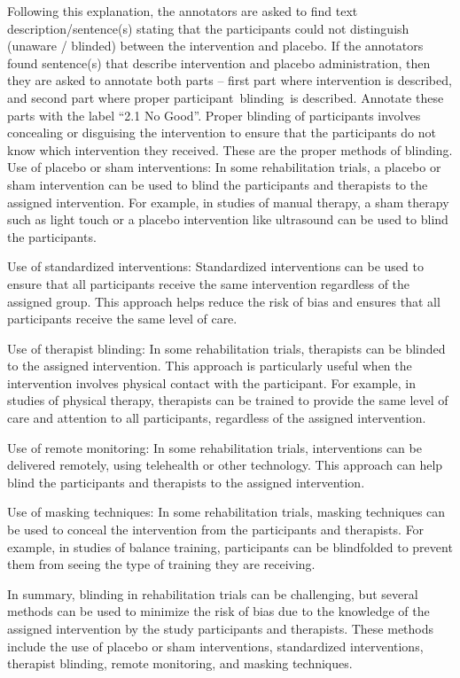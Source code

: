 \documentclass[sn-mathphys,Numbered]{sn-jnl}%
\begin{document}
Following this explanation, the annotators are asked to find text description/sentence(s) stating that the participants could not distinguish (unaware / blinded) between the intervention and placebo.
If the annotators found sentence(s) that describe intervention and placebo administration, then they are asked to annotate both parts – first part where intervention is described, and second part where proper participant blinding is described.
Annotate these parts with the label ``2.1 No Good''.
Proper blinding of participants involves concealing or disguising the intervention to ensure that the participants do not know which intervention they received.
These are the proper methods of blinding.
Use of placebo or sham interventions: In some rehabilitation trials, a placebo or sham intervention can be used to blind the participants and therapists to the assigned intervention. For example, in studies of manual therapy, a sham therapy such as light touch or a placebo intervention like ultrasound can be used to blind the participants.

Use of standardized interventions: Standardized interventions can be used to ensure that all participants receive the same intervention regardless of the assigned group. This approach helps reduce the risk of bias and ensures that all participants receive the same level of care.

Use of therapist blinding: In some rehabilitation trials, therapists can be blinded to the assigned intervention. This approach is particularly useful when the intervention involves physical contact with the participant. For example, in studies of physical therapy, therapists can be trained to provide the same level of care and attention to all participants, regardless of the assigned intervention.

Use of remote monitoring: In some rehabilitation trials, interventions can be delivered remotely, using telehealth or other technology. This approach can help blind the participants and therapists to the assigned intervention.

Use of masking techniques: In some rehabilitation trials, masking techniques can be used to conceal the intervention from the participants and therapists. For example, in studies of balance training, participants can be blindfolded to prevent them from seeing the type of training they are receiving.

In summary, blinding in rehabilitation trials can be challenging, but several methods can be used to minimize the risk of bias due to the knowledge of the assigned intervention by the study participants and therapists. These methods include the use of placebo or sham interventions, standardized interventions, therapist blinding, remote monitoring, and masking techniques.
\end{document}
